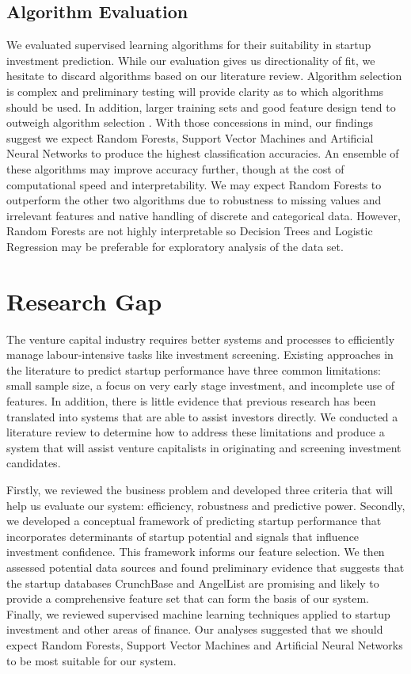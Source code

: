 \documentclass[../thesis/thesis.tex]{subfiles}
\begin{document}
\subsection{Algorithm Evaluation}

We evaluated supervised learning algorithms for their suitability in startup investment prediction. While our evaluation gives us directionality of fit, we hesitate to discard algorithms based on our literature review. Algorithm selection is complex and preliminary testing will provide clarity as to which algorithms should be used. In addition, larger training sets and good feature design tend to outweigh algorithm selection \cite{caruana2008}. With those concessions in mind, our findings suggest we expect Random Forests, Support Vector Machines and Artificial Neural Networks to produce the highest classification accuracies. An ensemble of these algorithms may improve accuracy further, though at the cost of computational speed and interpretability. We may expect Random Forests to outperform the other two algorithms due to robustness to missing values and irrelevant features and native handling of discrete and categorical data. However, Random Forests are not highly interpretable so Decision Trees and Logistic Regression may be preferable for exploratory analysis of the data set.

\section{Research Gap}

The venture capital industry requires better systems and processes to efficiently manage labour-intensive tasks like investment screening. Existing approaches in the literature to predict startup performance have three common limitations: small sample size, a focus on very early stage investment, and incomplete use of features. In addition, there is little evidence that previous research has been translated into systems that are able to assist investors directly. We conducted a literature review to determine how to address these limitations and produce a system that will assist venture capitalists in originating and screening investment candidates.

Firstly, we reviewed the business problem and developed three criteria that will help us evaluate our system: efficiency, robustness and predictive power. Secondly, we developed a conceptual framework of predicting startup performance that incorporates determinants of startup potential and signals that influence investment confidence. This framework informs our feature selection. We then assessed potential data sources and found preliminary evidence that suggests that the startup databases CrunchBase and AngelList are promising and likely to provide a comprehensive feature set that can form the basis of our system. Finally, we reviewed supervised machine learning techniques applied to startup investment and other areas of finance. Our analyses suggested that we should expect Random Forests, Support Vector Machines and Artificial Neural Networks to be most suitable for our system.
\end{document}

